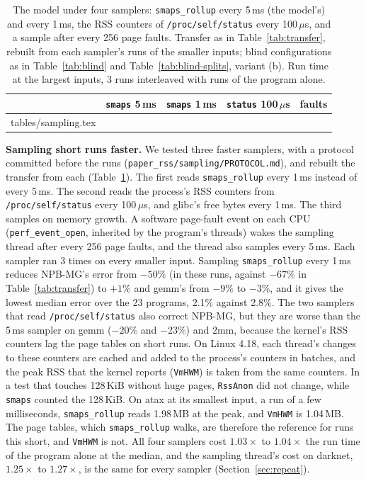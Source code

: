\documentclass[11pt]{article}
\makeatletter
\newcommand{\secref}[1]{Section~\ref{#1}}
\newcommand{\tabref}[1]{Table~\ref{#1}}
\newcommand{\tabinput}[1]{\@@input #1 }   %
\makeatother
\begin{document}
\begin{table}[t]
\centering
\small
\caption{The model under four samplers: \texttt{smaps\_rollup} every 5\,ms (the model's) and every 1\,ms, the RSS
counters of \texttt{/proc/self/status} every 100\,$\mu$s, and a sample after every 256 page faults. Transfer as in
\tabref{tab:transfer}, rebuilt from each sampler's runs of the smaller inputs; blind configurations as in
\tabref{tab:blind} and \tabref{tab:blind-splits}, variant (b). Run time at the largest inputs, 3 runs interleaved with
runs of the program alone.}
\label{tab:sampling}
\setlength{\tabcolsep}{5pt}
\begin{tabular}{lrrrr}
\toprule
 & \texttt{smaps} 5\,ms & \texttt{smaps} 1\,ms & \texttt{status} 100\,$\mu$s & faults \\
\midrule
\tabinput{tables/sampling.tex}
\bottomrule
\end{tabular}
\end{table}

\textbf{Sampling short runs faster.} We tested three faster samplers, with a protocol committed before the runs
(\texttt{paper\_rss/sampling/PROTOCOL.md}), and rebuilt the transfer from each (\tabref{tab:sampling}). The first reads
\texttt{smaps\_rollup} every 1\,ms instead of every 5\,ms. The second reads the process's RSS counters from
\texttt{/proc/self/status} every 100\,$\mu$s, and glibc's free bytes every 1\,ms. The third samples on memory growth.
A software page-fault event on each CPU (\texttt{perf\_event\_open}, inherited by the program's threads) wakes the
sampling thread after every 256 page faults, and the thread also samples every 5\,ms. Each sampler ran 3 times on every
smaller input. Sampling \texttt{smaps\_rollup} every 1\,ms reduces NPB-MG's error from $-50\%$ (in these runs, against
$-67\%$ in \tabref{tab:transfer}) to $+1\%$ and gemm's from $-9\%$ to $-3\%$, and it gives the lowest median error over
the 23 programs, 2.1\% against 2.8\%. The two samplers that read \texttt{/proc/self/status} also correct NPB-MG, but
they are worse than the 5\,ms sampler on gemm ($-20\%$ and $-23\%$) and 2mm, because the kernel's RSS counters lag the
page tables on short runs. On Linux 4.18, each thread's changes to these counters are cached and added to the process's
counters in batches, and the peak RSS that the kernel reports (\texttt{VmHWM}) is taken from the same counters. In a
test that touches 128\,KiB without huge pages, \texttt{RssAnon} did not change, while \texttt{smaps} counted the
128\,KiB. On atax at its smallest input, a run of a few milliseconds, \texttt{smaps\_rollup} reads 1.98\,MB at the
peak, and \texttt{VmHWM} is 1.04\,MB. The page tables, which \texttt{smaps\_rollup} walks, are therefore the reference
for runs this short, and \texttt{VmHWM} is not. All four samplers cost $1.03\times$ to $1.04\times$ the run time of the
program alone at the median, and the sampling thread's cost on darknet, $1.25\times$ to $1.27\times$, is the same for
every sampler (\secref{sec:repeat}).
\end{document}
